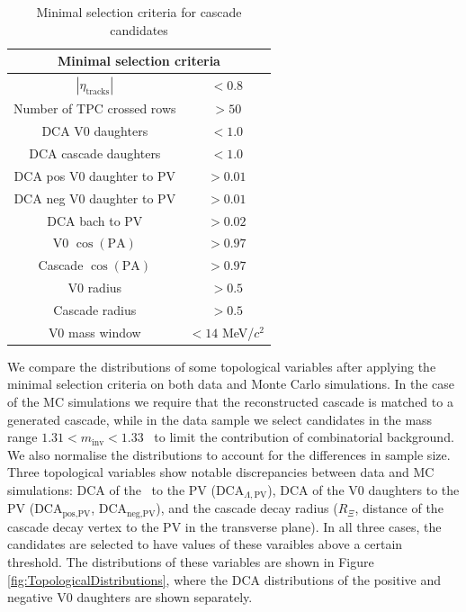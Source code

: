   \begin{table}[ht]
    \centering
    \begin{tabular}{c|c}
      \hline
      \multicolumn{2}{c}{Minimal selection criteria} \\
      \hline
      $|\eta_\text{tracks}|$ & $< 0.8$ \\
      Number of TPC crossed rows & $> 50$ \\
      DCA V0 daughters & $< 1.0$ \\
      DCA cascade daughters & $< 1.0$ \\
      DCA pos V0 daughter to PV & $> 0.01$ \\
      DCA neg V0 daughter to PV & $> 0.01$ \\
      DCA bach to PV & $> 0.02$ \\
      V0 $\cos(\text{PA})$ & $> 0.97$ \\
      Cascade $\cos(\text{PA})$ & $> 0.97$ \\
      V0 radius & $> 0.5$ \\
      Cascade radius & $> 0.5$ \\
      V0 mass window & $< 14$ MeV/$c^2$\\
      \hline
    \end{tabular}
    \caption{Minimal selection criteria for cascade candidates}
    \label{tab:minsel}
  \end{table}

  We compare the distributions of some topological variables after applying the minimal selection criteria on both data and Monte Carlo simulations. In the case of the MC simulations we require that the reconstructed cascade is matched to a generated cascade, while in the data sample we select candidates in the mass range $1.31 < m_\text{inv} < 1.33$ \gev~to limit the contribution of combinatorial background. We also normalise 
  the distributions to account for the differences in sample size. Three topological variables show notable discrepancies between data and MC simulations: DCA of the \Lambda\ to the PV (DCA$_{\Lambda,\text{PV}}$), DCA of the V0 daughters to the PV (DCA$_{\text{pos,PV}}$, DCA$_{\text{neg,PV}}$), and the cascade decay radius ($R_\Xi$, distance of the cascade decay vertex to the PV in the transverse plane). In all three cases, the candidates are selected to have values of these varaibles above a certain threshold. The distributions of these variables are shown in Figure \ref{fig:TopologicalDistributions}, where the DCA distributions of the positive and negative V0 daughters are shown separately. 

